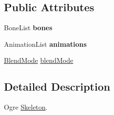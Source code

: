 \subsection*{Public Attributes}
\begin{DoxyCompactItemize}
\item 
\hypertarget{class_assimp_1_1_ogre_1_1_skeleton_a87f1a31580a581c78dc59e95338e090c}{Bone\+List {\bfseries bones}}\label{class_assimp_1_1_ogre_1_1_skeleton_a87f1a31580a581c78dc59e95338e090c}

\item 
\hypertarget{class_assimp_1_1_ogre_1_1_skeleton_a8abbe697cb28d3aa9e2273c1332dbc2c}{Animation\+List {\bfseries animations}}\label{class_assimp_1_1_ogre_1_1_skeleton_a8abbe697cb28d3aa9e2273c1332dbc2c}

\item 
\hyperlink{class_assimp_1_1_ogre_1_1_skeleton_a0a066387662c0279034d75bee5893b23}{Blend\+Mode} \hyperlink{class_assimp_1_1_ogre_1_1_skeleton_a6e29d13ff5cc937a8481c96024da5b0b}{blend\+Mode}
\end{DoxyCompactItemize}


\subsection{Detailed Description}
Ogre \hyperlink{class_assimp_1_1_ogre_1_1_skeleton}{Skeleton}. 

